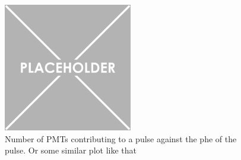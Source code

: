 \begin{figure}
    \centering
    \includegraphics[width=0.5\textwidth]{Figures/Placeholder.png}
    \caption{Number of PMTs contributing to a pulse against the phe of the pulse. Or some similar plot like that}
    \label{fig:OD_coincidence_difference}
\end{figure}
